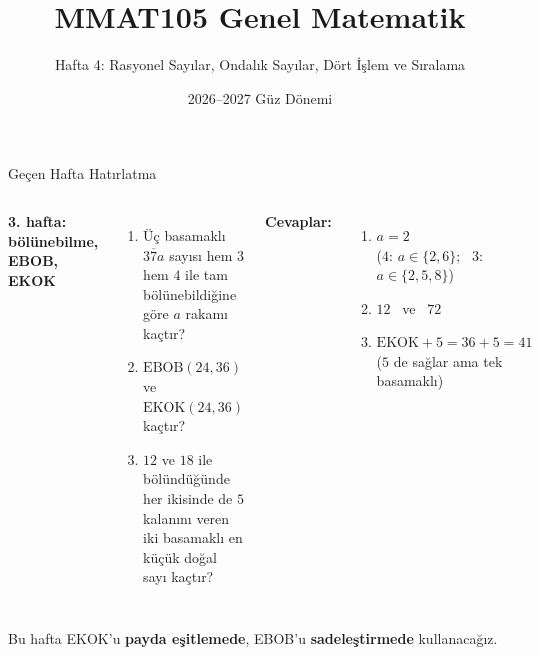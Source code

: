 \documentclass[aspectratio=169,11pt,handout]{beamer}
\title[MMAT105 -- Hafta 4]{MMAT105 Genel Matematik}
\subtitle{Hafta 4: Rasyonel Sayılar, Ondalık Sayılar, Dört İşlem ve Sıralama}
\author{}
\date{2026--2027 Güz Dönemi}
\newcommand{\ab}[1]{\overline{#1}}
\begin{document}
\begin{frame}
\titlepage
\end{frame}


\begin{frame}{Geçen Hafta Hatırlatma}
\begin{columns}[t]
\textbf{3. hafta: bölünebilme, EBOB, EKOK}
\begin{enumerate}
\item Üç basamaklı \(\ab{37a}\) sayısı hem \(3\) hem \(4\) ile tam bölünebildiğine göre \(a\) rakamı kaçtır?
\item \(\text{EBOB}(24,36)\) ve \(\text{EKOK}(24,36)\) kaçtır?
\item \(12\) ve \(18\) ile bölündüğünde her ikisinde de \(5\) kalanını veren iki basamaklı en küçük doğal sayı kaçtır?
\end{enumerate}
\pause
\textbf{Cevaplar:}
\begin{enumerate}
\item \(a=2\) \\ {\small (\(4\): \(a\in\{2,6\}\); \ \(3\): \(a\in\{2,5,8\}\))}
\item \(12\) \ ve \ \(72\)
\item \(\text{EKOK}+5=36+5=41\) \\ {\small (\(5\) de sağlar ama tek basamaklı)}
\end{enumerate}
\end{columns}
\vspace{4pt}
\small Bu hafta EKOK'u \textbf{payda eşitlemede}, EBOB'u \textbf{sadeleştirmede} kullanacağız.
\end{frame}
\end{document}
